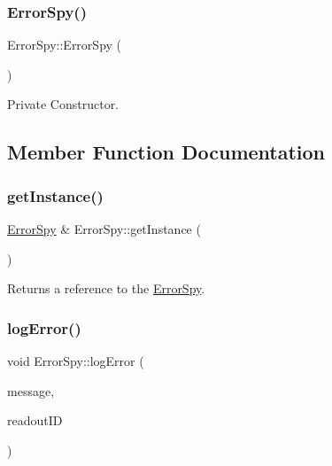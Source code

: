 \mbox{\label{class_error_spy_a8d07ccabb00ac3925d94d77e7092bc99}} 
\subsubsection{\texorpdfstring{Error\+Spy()}{ErrorSpy()}\hspace{0.1cm}{\footnotesize\ttfamily [3/3]}}
{\footnotesize\ttfamily Error\+Spy\+::\+Error\+Spy (\begin{DoxyParamCaption}{ }\end{DoxyParamCaption})\hspace{0.3cm}{\ttfamily [private]}}



Private Constructor. 



\subsection{Member Function Documentation}
\mbox{\label{class_error_spy_a154313e18c3c5e8bb8cba494e2eebdfd}} 
\subsubsection{\texorpdfstring{get\+Instance()}{getInstance()}}
{\footnotesize\ttfamily \hyperlink{class_error_spy}{Error\+Spy} \& Error\+Spy\+::get\+Instance (\begin{DoxyParamCaption}{ }\end{DoxyParamCaption})\hspace{0.3cm}{\ttfamily [static]}}



Returns a reference to the \hyperlink{class_error_spy}{Error\+Spy}. 

\mbox{\label{class_error_spy_af415d2e53a4465983a98ee14f653a0fa}} 
\subsubsection{\texorpdfstring{log\+Error()}{logError()}\hspace{0.1cm}{\footnotesize\ttfamily [1/3]}}
{\footnotesize\ttfamily void Error\+Spy\+::log\+Error (\begin{DoxyParamCaption}\item[{const std\+::string}]{message,  }\item[{const \hyperlink{class_readout_identifier}{Readout\+Identifier} \&}]{readout\+ID }\end{DoxyParamCaption})}




